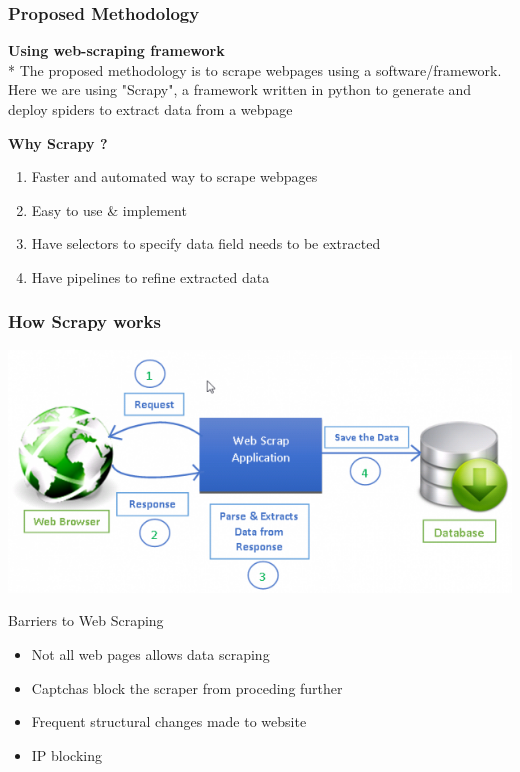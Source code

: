\documentclass{beamer}
\begin{document}
\begin{frame}[fragile]
\frametitle{Proposed Methodology}
\textbf{Using web-scraping framework}
\\*
The proposed methodology is to scrape webpages using a software/framework. Here we are using "Scrapy", a framework written in python to generate and deploy spiders to extract data from a webpage
\begin{mdframed}
\textbf{Why Scrapy ?}
\begin{enumerate}
\item Faster and automated way to scrape webpages
\item Easy to use \& implement
\item Have selectors to specify data field needs to be extracted
\item Have pipelines to refine extracted data
\end{enumerate}
\end{mdframed}
\end{frame}

\begin{frame}
\frametitle{ How Scrapy works}
\includegraphics[scale=.5]{custom-web-scraping-624x301.png} 
\end{frame}

\begin{frame}{Barriers to Web Scraping}
\begin{itemize}
\item Not all web pages allows data scraping
\item Captchas block the scraper from proceding further
\item Frequent structural changes made to website
\item IP blocking
\end{itemize}
\end{frame}
\end{document}
